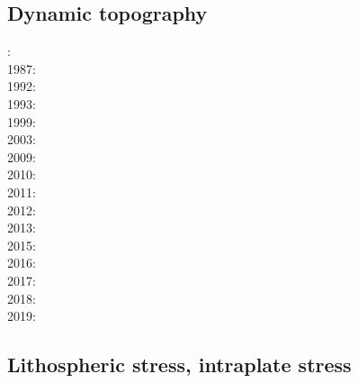 {\scriptsize
\noindent
\cite{werr07}
\cite{jaml10}
\cite{rera11}
\cite{matv15}
\cite{gubg19}
}

\subsection{Dynamic topography} 

{\scriptsize
{}: \cite{hacr85}\\
1987: \cite{repa87}\\
1992: \cite{kiha92}\\
1993: \cite{gurn93}\cite{gurn93b}\\
1999: \cite{bumo99}\\
2003: \cite{cogu03}\\
2009: \cite{cohu09}\\
2010: \cite{bofb10}\cite{brau10}\cite{stfh10}\cite{shml10}\\
2011: \cite{rapy11}\\
2012: \cite{shlm12}\cite{zhzf12}\\
2013: \cite{brrs13}\cite{flgm13}\\
2015: \cite{aupm15}\cite{kiff15}\cite{dali15}\\
2016: \cite{howa16}\cite{gvfb16}\cite{yagu16}\cite{stei16}\cite{cogb16}\\
2017: \cite{yamm17}\cite{aumh17}\\
2018: \cite{osss18}\cite{vibc18}\\
2019: \cite{deli19}\cite{davk19}\cite{bore19}
}

\subsection{Lithospheric stress, intraplate stress}

